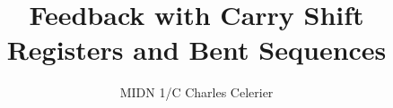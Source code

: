 \title{Feedback with Carry Shift Registers and Bent Sequences}
\author{MIDN 1/C Charles Celerier}

\maketitle
